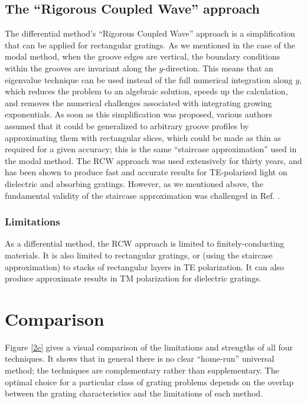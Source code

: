 \documentclass[singlespace,proposal]{uofsthesis-cs}
\begin{document}
\subsection{The ``Rigorous Coupled Wave'' approach}
The differential method's ``Rigorous Coupled Wave'' approach is a simplification that can be applied for rectangular gratings.  As we mentioned in the case of the modal method, when the groove edges are vertical, the boundary conditions within the grooves are invariant along the $y$-direction.  This means that an eigenvalue technique can be used instead of the full numerical integration along $y$, which reduces the problem to an algebraic solution, speeds up the calculation, and removes the numerical challenges associated with integrating growing exponentials.  As soon as this simplification was proposed, various authors \cite{Bur66} \cite{Pen75} \cite{Moh81} assumed that it could be generalized to arbitrary groove profiles by approximating them with rectangular slices, which could be made as thin as required for a given accuracy; this is the same ``staircase approximation'' used in the modal method.  The RCW approach was used extensively for thirty years, and has been shown to produce fast and accurate results for TE-polarized light on dielectric and absorbing gratings.  However, as we mentioned above, the fundamental validity of the staircase approximation was challenged in Ref. \cite{Pop02}.

\subsubsection{Limitations}
As a differential method, the RCW approach is limited to finitely-conducting materials.  It is also limited to rectangular gratings, or (using the staircase approximation) to stacks of rectangular layers in TE polarization.  It can also produce approximate results in TM polarization for dielectric gratings.

\section{Comparison}
Figure \ref{2e} gives a visual comparison of the limitations and strengths of all four techniques.  It shows that in general there is no clear ``home-run'' universal method; the techniques are complementary rather than supplementary.  The optimal choice for a particular class of grating problems depends on the overlap between the grating characteristics and the limitations of each method.
\end{document}
